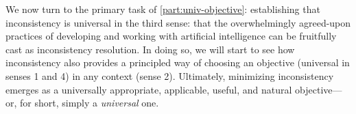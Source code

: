 We now turn to the primary task of \cref{part:univ-objective}: establishing that inconsistency is universal in the third sense: that the overwhelmingly agreed-upon practices of developing and working with artificial intelligence can be fruitfully cast as inconsistency resolution. 
In doing so, we will start to see how inconsistency also provides a principled way of choosing an objective (universal in senses 1 and 4) in any context (sense 2).
Ultimately, minimizing inconsistency emerges as a universally appropriate, applicable, useful, and natural objective---or, for short, simply a \emph{universal} one. 




%

